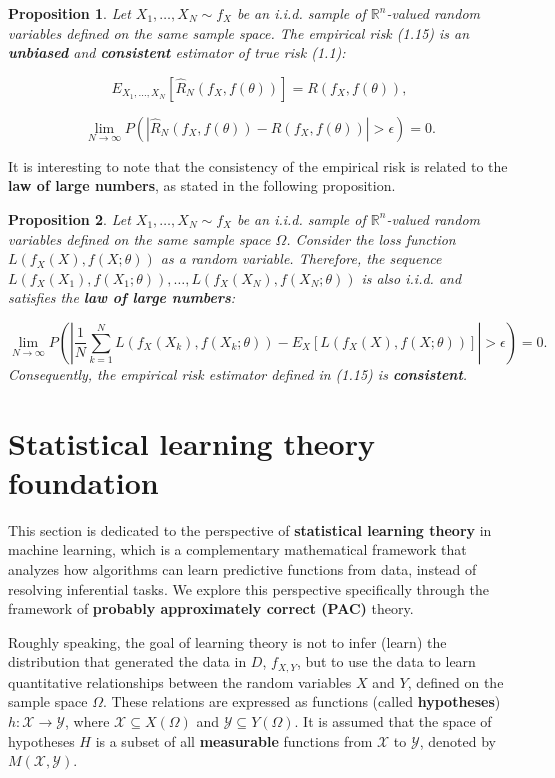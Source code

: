 \documentclass{report}
\newtheorem{proposition}{Proposition}[chapter]
\begin{document}
\begin{proposition}
Let $X_1,\dots,X_N \sim f_X$ be an i.i.d. sample of $\mathbb{R}^n$-valued random variables defined on the same sample space. The empirical risk (1.15) is an \textbf{unbiased} and \textbf{consistent} estimator of true risk (1.1):

\begin{equation}
E_{X_1,...,X_N}[\hat{R}_N(f_X,f(\theta))] = R(f_X,f(\theta)),
\end{equation}

\begin{equation}
\lim_{N\to \infty}P(|\hat{R}_N(f_X,f(\theta))-R(f_X,f(\theta))| > \epsilon) = 0.
\end{equation}
\end{proposition}
It is interesting to note that the consistency of the empirical risk is related to the \textbf{law of large numbers}, as stated in the following proposition.

\begin{proposition}
Let $X_1,\dots,X_N \sim f_X$ be an i.i.d. sample of $\mathbb{R}^n$-valued random variables defined on the same sample space $\Omega$. Consider the loss function $L(f_X(X), f(X;\theta))$ as a random variable. Therefore, the sequence $L(f_X(X_1),f(X_1;\theta)),\dots,L(f_X(X_N),f(X_N;\theta))$ is also i.i.d. and satisfies the \textbf{law of large numbers}:

\begin{equation}
\lim_{N\to \infty}P\left(\left|\frac{1}{N}\sum_{k=1}^NL(f_X(X_k),f(X_k;\theta)) - E_{X}[L(f_X(X),f(X;\theta))]\right| > \epsilon\right) = 0.
\end{equation}
Consequently, the empirical risk estimator defined in (1.15) is \textbf{consistent}.
\end{proposition}

\section{Statistical learning theory foundation}
This section is dedicated to the perspective of \textbf{statistical learning theory} in machine learning, which is a complementary mathematical framework that analyzes how algorithms can learn predictive functions from data, instead of resolving inferential tasks. We explore this perspective specifically through the framework of \textbf{probably approximately correct (PAC)} theory.

Roughly speaking, the goal of learning theory is not to infer (learn) the distribution that generated the data in $D$, $f_{X,Y}$, but to use the data to learn quantitative relationships between the random variables $X$ and $Y$, defined on the sample space $\Omega$. These relations are expressed as functions (called \textbf{hypotheses}) $h : \mathcal{X} \to \mathcal{Y}$, where $\mathcal{X} \subseteq X(\Omega)$ and $\mathcal{Y} \subseteq Y(\Omega)$. It is assumed that the space of hypotheses $H$ is a subset of all \textbf{measurable} functions from $\mathcal{X}$ to $\mathcal{Y}$, denoted by $M(\mathcal{X}, \mathcal{Y})$.
\end{document}
